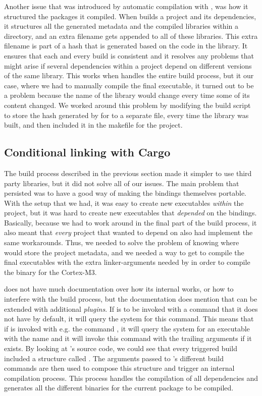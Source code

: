 Another issue that was introduced by automatic compilation with {\cargo}, was how it structured the packages it compiled.
When {\cargo} builds a project and its dependencies, it structures all the generated metadata and the compiled libraries within a  directory, and an extra filename gets appended to all of these libraries.
This extra filename is part of a hash that is generated based on the code in the library.
It ensures that each and every build is consistent and it resolves any problems that might arise if several dependencies within a project depend on different versions of the same library.
This works when {\cargo} handles the entire build process, but it our case, where we had to manually compile the final executable, it turned out to be a problem because the name of the library would change every time some of its content changed.
We worked around this problem by modifying the build script to store the hash generated by {\cargo} for {\emlib} to a separate file, every time the library was built, and then included it in the makefile for the project.

\subsection{Conditional linking with Cargo}

The build process described in the previous section made it simpler to use third party libraries, but it did not solve all of our issues.
The main problem that persisted was to have a good way of making the bindings themselves portable.
With the setup that we had, it was easy to create new executables \emph{within} the project, but it was hard to create new executables that \emph{depended} on the bindings.
Basically, because we had to work around {\cargo} in the final part of the build process, it also meant that \emph{every} project that wanted to depend on {\emlib} also had implement the same workarounds.
Thus, we needed to solve the problem of knowing where {\cargo} would store the project metadata, and we needed a way to get {\cargo} to compile the final executables with the extra linker-arguments needed by {\rustc} in order to compile the binary for the Cortex-M3.

{\cargo} does not have much documentation over how its internal works, or how to interfere with the build process, but the documentation does mention that {\cargo} can be extended with additional \emph{plugins}.
If {\cargo} is to be invoked with a command that it does not have by default, it will query the system for this command.
This means that if {\cargo} is invoked with e.g. the command , it will query the system for an executable with the name  and it will invoke this command with the trailing arguments if it exists.
By looking at {\cargo}'s source code, we could see that every triggered build included a structure called .
The arguments passed to {\cargo}'s different build commands are then used to compose this structure and trigger an internal compilation process.
This process handles the compilation of all dependencies and generates all the different binaries for the current package to be compiled.

